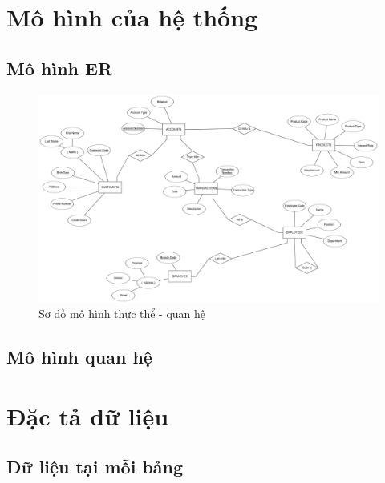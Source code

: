 \documentclass[a4paper, 12pt]{report}
\begin{document}
\chapter{Mô hình của hệ thống}

\section{Mô hình ER}

\begin{figure}[H]
    \centering
    \includegraphics[width=1\textwidth]{ER-Diagram.png}
    \caption{Sơ đồ mô hình thực thể - quan hệ}
    \label{fig:br-wm-2020}
\end{figure}

\section{Mô hình quan hệ}


\chapter{Đặc tả dữ liệu}

\section{Dữ liệu tại mỗi bảng}






\end{document}
